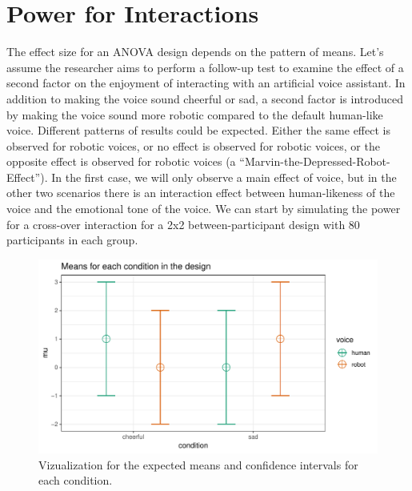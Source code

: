 \documentclass[,jou, draftfirst, a4paper,floatsintext]{apa6}
\begin{document}
\hypertarget{power-for-interactions}{%
\section{Power for Interactions}\label{power-for-interactions}}

The effect size for an ANOVA design depends on the pattern of means.
Let's assume the researcher aims to perform a follow-up test to examine the effect of a second factor on the enjoyment of interacting with an artificial voice assistant.
In addition to making the voice sound cheerful or sad, a second factor is introduced by making the voice sound more robotic compared to the default human-like voice.
Different patterns of results could be expected.
Either the same effect is observed for robotic voices, or no effect is observed for robotic voices, or the opposite effect is observed for robotic voices (a \enquote{Marvin-the-Depressed-Robot-Effect}).
In the first case, we will only observe a main effect of voice, but in the other two scenarios there is an interaction effect between human-likeness of the voice and the emotional tone of the voice. We can start by simulating the power for a cross-over interaction for a 2x2 between-participant design with 80 participants in each group.

\begin{figure}
\centering
\includegraphics{0.1_Simulation_Based_Power_Analysis_For_Factorial_ANOVA_Designs_files/figure-latex/mean-plot-1.pdf}
\caption{\label{fig:mean-plot}Vizualization for the expected means and confidence intervals for each condition.}
\end{figure}
\end{document}

